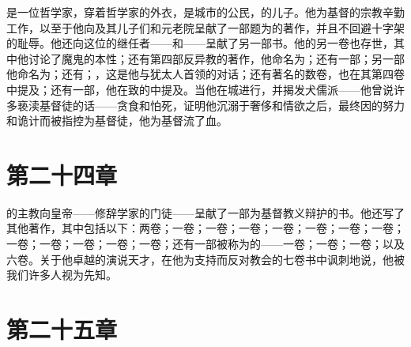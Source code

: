 是一位哲学家，穿着哲学家的外衣，是城市的公民，的儿子。他为基督的宗教辛勤工作，以至于他向及其儿子们和元老院呈献了一部题为的著作，并且不回避十字架的耻辱。他还向这位的继任者——和——呈献了另一部书。他的另一卷也存世，其中他讨论了魔鬼的本性；还有第四部反异教的著作，他命名为；还有一部；另一部他命名为；还有；，这是他与犹太人首领的对话；还有著名的数卷，也在其第四卷中提及；还有一部，他在致的中提及。当他在城进行，并揭发犬儒派——他曾说许多亵渎基督徒的话——贪食和怕死，证明他沉溺于奢侈和情欲之后，最终因的努力和诡计而被指控为基督徒，他为基督流了血。\par


\section{第二十四章}

的主教向皇帝——修辞学家的门徒——呈献了一部为基督教义辩护的书。他还写了其他著作，其中包括以下：两卷；一卷；一卷；一卷；一卷；一卷；一卷；一卷；一卷；一卷；一卷；一卷；一卷；还有一部被称为的——一卷；一卷；一卷；以及六卷。关于他卓越的演说天才，在他为支持而反对教会的七卷书中讽刺地说，他被我们许多人视为先知。\par


\section{第二十五章}

